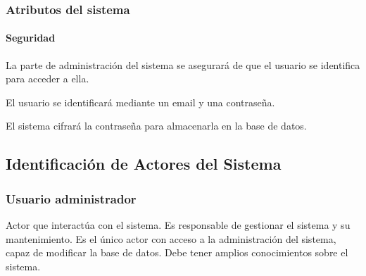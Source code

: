 \subsubsection{Atributos del sistema}

\paragraph*{Seguridad}
\begin{myEnumSEG}
	\item La parte de administración del sistema se asegurará de que el usuario se identifica para acceder a ella.
	\begin{myEnumSEG}
		\item El usuario se identificará mediante un email y una contraseña.
	\end{myEnumSEG}
	\item El sistema cifrará la contraseña para almacenarla en la base de datos.
\end{myEnumSEG}


\subsection{Identificación de Actores del Sistema} 
\subsubsection{Usuario administrador}
Actor que interactúa con el sistema. Es responsable de gestionar el sistema y su mantenimiento. Es el único actor con acceso a la administración del sistema, capaz de modificar la base de datos. Debe tener amplios conocimientos sobre el sistema.

